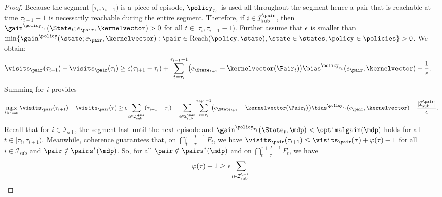 \documentclass[preprint,cleveref,12pt]{colt2025}
\DeclarePairedDelimiter{\braces}{\{}{\}}	%
\DeclarePairedDelimiter{\parens}{(}{)}	%
\DeclarePairedDelimiter{\abs}{\lvert}{\rvert}	%
\def\model{\mdp}
\def\kernel{\kernelvector}
\def\optgain{\optimalgain} %
\def\Reach{\mathrm{Reach}}
\begin{document}
\begin{proof}
        Because the segment $[\tau_i, \tau_{i+1})$ is a piece of episode, $\policy_{\tau_i}$ is used all throughout the segment hence a pair that is reachable at time $\tau_{i+1}-1$ is necessarily reachable during the entire segment. 
        Therefore, if $i \in \mathcal{I}_\mathrm{sub}^\pair$, then $\gain^{\policy_{\tau_i}}(\State_t; e_\pair, \kernel) > 0$ for all $t \in [\tau_i, \tau_{i+1}-1)$. 
        Further assume that $\epsilon$ is smaller than $\min \braces{\gain^\policy(\state; e_\pair, \kernel) : \pair \in \Reach(\policy, \state), \state \in \states, \policy \in \policies} > 0$.
        We obtain:
        \begin{align*}
            \visits_\pair(\tau_{i+1}) - \visits_\pair(\tau_i) 
            & \ge
            \epsilon (\tau_{i+1} - \tau_i)
            +
            \sum_{t=\tau_i}^{\tau_{i+1}-1}
            \parens*{
                e_{\State_{t+1}} - \kernel(\Pair_t)
            } \bias^{\policy_{\tau_i}}(e_\pair, \kernel)
            - \frac 1\epsilon
            .
        \end{align*}
        Summing for $i$ provides
        \begin{equation}
            \nonumber
            \max_{i \in \mathcal{I}_\mathrm{sub}} 
            \visits_\pair(\tau_{i+1}) - \visits_\pair(\tau)
            \ge
            \epsilon 
            \sum_{i \in \mathcal{I}_\mathrm{sub}^\pair} 
            (\tau_{i+1} - \tau_i)
            +
            \sum_{i \in \mathcal{I}_\mathrm{sub}^\pair} 
            \sum_{t=\tau_i}^{\tau_{i+1}-1}
            \parens*{
                e_{\State_{t+1}} - \kernel(\Pair_t)
            } \bias^{\policy_{\tau_i}}(e_\pair, \kernel)
            - \frac {\abs{\mathcal{I}_\mathrm{sub}^\pair}}\epsilon
            .
        \end{equation}
        Recall that for $i \in \mathcal{I}_\mathrm{sub}$, the segment last until the next episode and $\gain^{\policy_{\tau_i}}(\State_t, \model) < \optgain(\model)$ holds for all $t \in [\tau_i, \tau_{i+1})$.  
        Meanwhile, coherence guarantees that, on $\bigcap_{t=\tau}^{\tau+T-1} F_t$, we have $\visits_\pair(\tau_{i+1}) \le \visits_\pair(\tau) + \varphi(\tau) + 1$ for all $i \in \mathcal{I}_\mathrm{sub}$ and $\pair \notin \pairs^*(\model)$.  
        So, for all $\pair \notin \pairs^*(\model)$ and on $\bigcap_{t=\tau}^{\tau+T-1} F_t$, we have
        \begin{equation}
        \nonumber
            \varphi(\tau) + 1 
            \ge 
            \epsilon 
            \sum_{i \in \mathcal{I}_\mathrm{sub}^\pair} 

\end{equation}
\end{proof}
\end{document}
